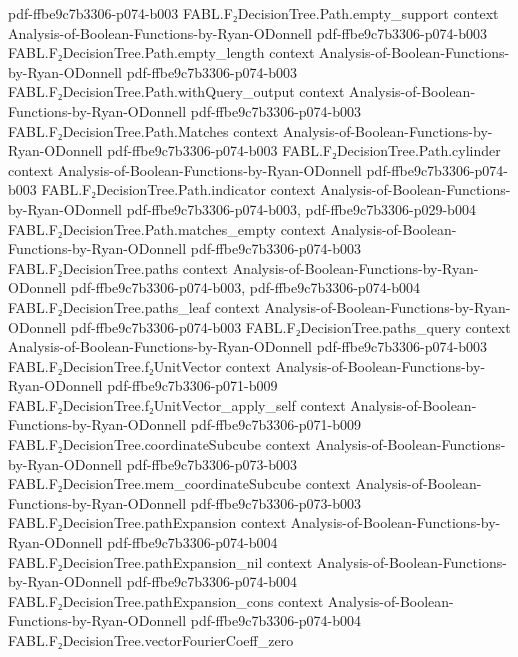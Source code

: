 \begin{theorem}
  {pdf-ffbe9c7b3306-p074-b003}
\proofstep
  {FABL.F₂DecisionTree.Path.empty_support}
  {context}
  {Analysis-of-Boolean-Functions-by-Ryan-ODonnell}
  {pdf-ffbe9c7b3306-p074-b003}
\proofstep
  {FABL.F₂DecisionTree.Path.empty_length}
  {context}
  {Analysis-of-Boolean-Functions-by-Ryan-ODonnell}
  {pdf-ffbe9c7b3306-p074-b003}
\proofstep
  {FABL.F₂DecisionTree.Path.withQuery_output}
  {context}
  {Analysis-of-Boolean-Functions-by-Ryan-ODonnell}
  {pdf-ffbe9c7b3306-p074-b003}
\proofstep
  {FABL.F₂DecisionTree.Path.Matches}
  {context}
  {Analysis-of-Boolean-Functions-by-Ryan-ODonnell}
  {pdf-ffbe9c7b3306-p074-b003}
\proofstep
  {FABL.F₂DecisionTree.Path.cylinder}
  {context}
  {Analysis-of-Boolean-Functions-by-Ryan-ODonnell}
  {pdf-ffbe9c7b3306-p074-b003}
\proofstep
  {FABL.F₂DecisionTree.Path.indicator}
  {context}
  {Analysis-of-Boolean-Functions-by-Ryan-ODonnell}
  {pdf-ffbe9c7b3306-p074-b003,
    pdf-ffbe9c7b3306-p029-b004}
\proofstep
  {FABL.F₂DecisionTree.Path.matches_empty}
  {context}
  {Analysis-of-Boolean-Functions-by-Ryan-ODonnell}
  {pdf-ffbe9c7b3306-p074-b003}
\proofstep
  {FABL.F₂DecisionTree.paths}
  {context}
  {Analysis-of-Boolean-Functions-by-Ryan-ODonnell}
  {pdf-ffbe9c7b3306-p074-b003,
    pdf-ffbe9c7b3306-p074-b004}
\proofstep
  {FABL.F₂DecisionTree.paths_leaf}
  {context}
  {Analysis-of-Boolean-Functions-by-Ryan-ODonnell}
  {pdf-ffbe9c7b3306-p074-b003}
\proofstep
  {FABL.F₂DecisionTree.paths_query}
  {context}
  {Analysis-of-Boolean-Functions-by-Ryan-ODonnell}
  {pdf-ffbe9c7b3306-p074-b003}
\proofstep
  {FABL.F₂DecisionTree.f₂UnitVector}
  {context}
  {Analysis-of-Boolean-Functions-by-Ryan-ODonnell}
  {pdf-ffbe9c7b3306-p071-b009}
\proofstep
  {FABL.F₂DecisionTree.f₂UnitVector_apply_self}
  {context}
  {Analysis-of-Boolean-Functions-by-Ryan-ODonnell}
  {pdf-ffbe9c7b3306-p071-b009}
\proofstep
  {FABL.F₂DecisionTree.coordinateSubcube}
  {context}
  {Analysis-of-Boolean-Functions-by-Ryan-ODonnell}
  {pdf-ffbe9c7b3306-p073-b003}
\proofstep
  {FABL.F₂DecisionTree.mem_coordinateSubcube}
  {context}
  {Analysis-of-Boolean-Functions-by-Ryan-ODonnell}
  {pdf-ffbe9c7b3306-p073-b003}
\proofstep
  {FABL.F₂DecisionTree.pathExpansion}
  {context}
  {Analysis-of-Boolean-Functions-by-Ryan-ODonnell}
  {pdf-ffbe9c7b3306-p074-b004}
\proofstep
  {FABL.F₂DecisionTree.pathExpansion_nil}
  {context}
  {Analysis-of-Boolean-Functions-by-Ryan-ODonnell}
  {pdf-ffbe9c7b3306-p074-b004}
\proofstep
  {FABL.F₂DecisionTree.pathExpansion_cons}
  {context}
  {Analysis-of-Boolean-Functions-by-Ryan-ODonnell}
  {pdf-ffbe9c7b3306-p074-b004}
\proofstep
  {FABL.F₂DecisionTree.vectorFourierCoeff_zero}

\end{theorem}
